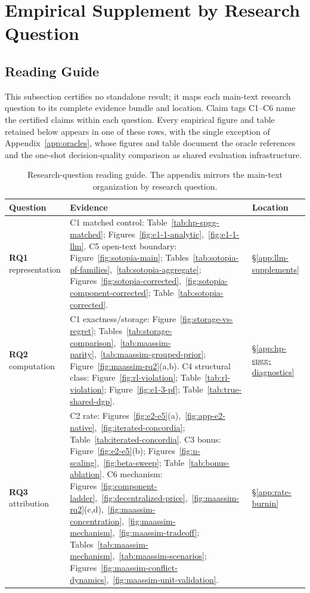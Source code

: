 \section{Empirical Supplement by Research Question}
\label{app:experiment-supplement}
\setcounter{subsection}{-1}

\subsection{Reading Guide}
\label{app:inventory}

This subsection certifies no standalone result; it maps each main-text research question to its complete evidence bundle and location. Claim tags C1--C6 name the certified claims within each question. Every empirical figure and table retained below appears in one of these rows, with the single exception of Appendix~\ref{app:oracles}, whose figures and table document the oracle references and the one-shot decision-quality comparison as shared evaluation infrastructure.

\begin{table}[h!]
\centering\scriptsize
\caption{Research-question reading guide. The appendix mirrors the main-text organization by research question.}
\label{tab:appendix-inventory}
\setlength{\tabcolsep}{1pt}
\begin{tabular}{@{}p{}>{\raggedright\arraybackslash}p{}p{}@{}}
\toprule
Question & Evidence & Location \\
\midrule
\textbf{RQ1} representation & C1 matched control: Table~\ref{tab:hp-spgg-matched}; Figures~\ref{fig:e1-1-analytic},~\ref{fig:e1-1-llm}. C5 open-text boundary: Figure~\ref{fig:sotopia-main}; Tables~\ref{tab:sotopia-pf-families},~\ref{tab:sotopia-aggregate}; Figures~\ref{fig:sotopia-corrected},~\ref{fig:sotopia-component-corrected}; Table~\ref{tab:sotopia-corrected}. & \S\ref{app:llm-supplements} \\[2pt]
\textbf{RQ2} computation & C1 exactness/storage: Figure~\ref{fig:storage-vs-regret}; Tables~\ref{tab:storage-comparison},~\ref{tab:maassim-parity},~\ref{tab:maassim-grouped-prior}; Figure~\ref{fig:maassim-rq2}(a,b). C4 structural class: Figure~\ref{fig:rl-violation}; Table~\ref{tab:rl-violation}; Figure~\ref{fig:e1-3-pf}; Table~\ref{tab:true-shared-dgp}. & \S\ref{app:hp-spgg-diagnostics} \\[2pt]
\textbf{RQ3} attribution & C2 rate: Figures~\ref{fig:e2-e5}(a),~\ref{fig:app-e2-native},~\ref{fig:iterated-concordia}; Table~\ref{tab:iterated-concordia}. C3 bonus: Figure~\ref{fig:e2-e5}(b); Figures~\ref{fig:n-scaling},~\ref{fig:beta-sweep}; Table~\ref{tab:bonus-ablation}. C6 mechanism: Figures~\ref{fig:component-ladder},~\ref{fig:decentralized-price},~\ref{fig:maassim-rq2}(c,d),~\ref{fig:maassim-concentration},~\ref{fig:maassim-mechanism},~\ref{fig:maassim-tradeoff}; Tables~\ref{tab:maassim-mechanism},~\ref{tab:maassim-scenarios}; Figures~\ref{fig:maassim-conflict-dynamics},~\ref{fig:maassim-unit-validation}. & \S\ref{app:rate-burnin} \\
\bottomrule
\end{tabular}
\end{table}

